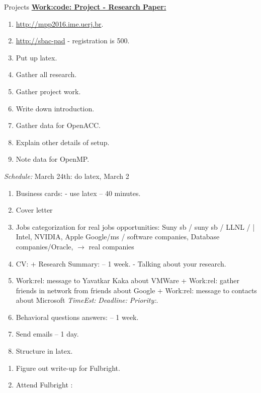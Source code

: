 \documentclass[serif, mathserif, final]{beamer}
\newcommand{\te}[1]{\textit{TimeEst:}\textit{#1}}
\newcommand{\dl}[1]{\textit{Deadline:}\textit{#1}}
\newcommand{\pr}[1]{\textit{Priority:}\textit{#1}}
\begin{document}
\begin{frame}
\begin{columns}
\begin{column}{0.5\textwidth}
\begin{block}{Projects}
{\underline{\bf Work:code: Project - Research Paper:}}
\begin{enumerate}
\tiny \item \tiny \url{http://mpp2016.ime.uerj.br}. 
\item \tiny \url{http://sbac-pad}  - registration is  500.
\item \tiny Put up latex.  
\item \tiny Gather all research. 
\item \tiny Gather project work. 
\item \tiny Write down introduction.
\item \tiny Gather data for OpenACC. 
\item \tiny Explain other details of setup. 
\item \tiny Note data for OpenMP. 
\end{enumerate} 
\textit{Schedule:} March 24th: do latex, March 2 \\
\begin{enumerate} 
\tiny \item \tiny Business cards:  - use latex  -- 40 minutes. 
\item \tiny Cover letter 
\item \tiny Jobs categorization for real jobs opportunities: 
Suny sb / suny sb / LLNL /  |  Intel, NVIDIA, Apple  Google/ms /
software companies, Database companies/Oracle, $\rightarrow$ real companies 
\item \tiny CV: + Research Summary:  -- 1 week.  - Talking about
  your research.
\item \tiny Work:rel: message to Yavatkar Kaka about VMWare +
  Work:rel: gather friends in network from friends about Google +
  Work:rel: message to contacts about Microsoft \te{} \dl{} \pr{}. 
\item \tiny Behavioral questions answers:    -- 1 week. 
\item \tiny Send emails – 1 day. 
\item \tiny Structure in latex. 
\end{enumerate}
\begin{enumerate} 
\tiny \item \tiny Figure out write-up for Fulbright. 
\item \tiny Attend Fulbright : 

\end{enumerate}
\end{block}
\end{column}
\end{columns}
\end{frame}
\end{document}
